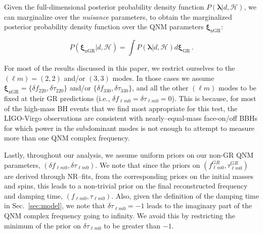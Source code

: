 \documentclass[twocolumn,prd,aps,superscriptaddress,preprintnumbers,tightenlines,showpacs,nofootinbib,eqsecnum,amsfonts,amsmath]{revtex4-1}
\newcommand{\abhi}[1]{\textcolor{red}{[\textit{AG: #1}]}}
\newcommand{\blambda}{\bm{\lambda}}
\newcommand{\bxigr}{\bm{\xi}_{\text{GR}}}
\newcommand{\bxingr}{\bm{\xi}_{\text{nGR}}}
\newcommand{\df}[1]{\delta f_{\text{#1}}}
\newcommand{\dtau}[1]{\delta \tau_{\text{#1}}}
\begin{document}
Given the full-dimensional posterior probability density function $P(\blambda | d, \mathcal{H})$, we can marginalize over the \emph{nuisance} parameters, to obtain the marginalized posterior probability density function over the QNM parameters $\bxingr$:

\begin{equation}
P(\bxingr | d, \mathcal{H})= \int P(\blambda | d, \mathcal{H}) d\bxigr\,.
\end{equation}

For most of the results discussed in this paper, we restrict ourselves
to the $(\ell m) = (2,2)$ and/or $(3,3)$ modes. In those cases we assume $\bxingr = \{\df{220},\dtau{220}\}$ and/or $
\{\df{330},\dtau{330}\}$, and all the other $(\ell m)$ modes to be
fixed at their GR predictions (i.e., $\delta f_{\ell m 0} = \delta
\tau_{\ell m 0} = 0$). This is because, for most of the high-mass BH 
events that we find most appropriate for this test, the LIGO-Virgo
observations are consistent with nearly--equal-mass face-on/off BBHs 
for which power in the subdominant modes is not enough to
attempt to measure more than one QNM complex frequency.

Lastly, throughout our analysis, we assume uniform priors on our non-GR QNM
parameters, $(\delta f_{\ell m 0},\delta \tau_{\ell m 0})$. We note that
since the priors on $( f_{\ell m 0}^{GR},\tau_{\ell m 0}^{GR})$ are
derived through NR--fits, from the corresponding priors on the initial
masses and spins, this leads to a non-trivial prior on the final
reconstructed frequency and damping time, $( f_{\ell m 0},\tau_{\ell m
  0})$. Also, given the definition of the damping time in
Sec.~\ref{sec:model}, we note that $\delta \tau_{\ell m 0} = -1$ leads
to the imaginary part of the QNM complex frequency going to infinity. We avoid
this by restricting the minimum of the prior on $\delta \tau_{\ell m
  0}$ to be greater than $-1$.

\end{document}
